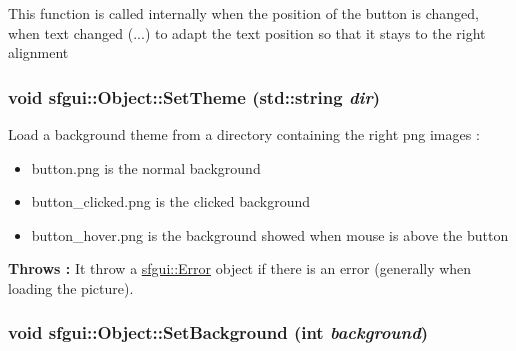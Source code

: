 This function is called internally when the position of the button is changed, when text changed (...) to adapt the text position so that it stays to the right alignment \hypertarget{classsfgui_1_1Object_96e00c4db6358d27ad806c0053e343a1}{
\subsubsection[SetTheme]{\setlength{\rightskip}{0pt plus 5cm}void sfgui::Object::SetTheme (std::string {\em dir})}}
\label{classsfgui_1_1Object_96e00c4db6358d27ad806c0053e343a1}




Load a background theme from a directory containing the right png images : \begin{itemize}
\item button.png is the normal background \item button\_\-clicked.png is the clicked background \item button\_\-hover.png is the background showed when mouse is above the button \end{itemize}
{\bf Throws : }It throw a \hyperlink{classsfgui_1_1Error}{sfgui::Error} object if there is an error (generally when loading the picture). \hypertarget{classsfgui_1_1Object_b3477443fde0d86be5e32f5c1dcd7b01}{
\subsubsection[SetBackground]{\setlength{\rightskip}{0pt plus 5cm}void sfgui::Object::SetBackground (int {\em background})}}
\label{classsfgui_1_1Object_b3477443fde0d86be5e32f5c1dcd7b01}




